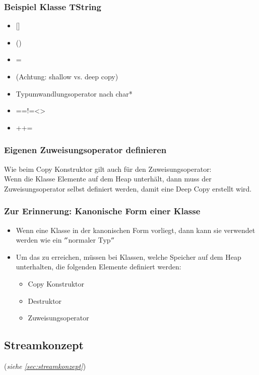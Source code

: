 \begin{multicols}{2}
\subsubsection{Beispiel Klasse TString}
\begin{itemize}
	\item{} []
	\item{} ()
	\item{} =
	\item[\-] (Achtung: shallow vs. deep copy)
	\item Typumwandlungsoperator nach char*
	\item{} ==\quad!=\quad<\quad>
	\item{} +\quad+=
\end{itemize}
\vfill\null
\columnbreak
\subsubsection{Eigenen Zuweisungsoperator definieren}
Wie beim Copy Konstruktor gilt auch für den Zuweisungsoperator:\\
Wenn die Klasse Elemente auf dem Heap unterhält, dann muss der Zuweisungsoperator selbst definiert werden, damit eine Deep Copy erstellt wird.
\end{multicols}

\subsubsection{Zur Erinnerung: Kanonische Form einer Klasse}
\begin{itemize}
	\item Wenn eine Klasse in der kanonischen Form vorliegt, dann kann sie verwendet werden wie ein $"$normaler Typ$"$
	\item Um das zu erreichen, müssen bei Klassen, welche Speicher auf dem Heap unterhalten, die folgenden Elemente definiert werden:
	\begin{itemize}
		\item Copy Konstruktor
		\item Destruktor
		\item Zuweisungsoperator
	\end{itemize}
\end{itemize}

\subsection{Streamkonzept}
\label{sec:streamkonzeptOverloading}
(\emph{siehe \ref{sec:streamkonzept}})

